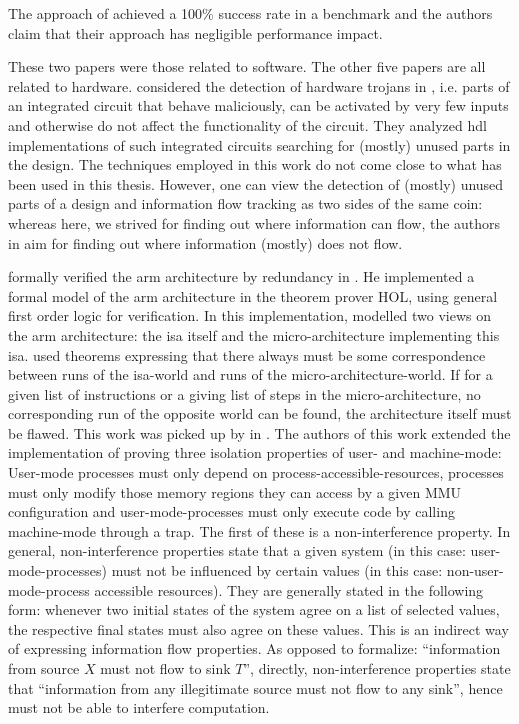 The approach of \cite{SuhLZD04} achieved a 100\% success rate in a benchmark and the authors claim that their approach has negligible performance impact.

These two papers were those related to software.
The other five papers are all related to hardware.
\citeauthor{Zhang15} considered the detection of hardware trojans in  \cite{Zhang15}, i.e. parts of an integrated circuit that behave maliciously, can be activated by very few inputs and otherwise do not affect the functionality of the circuit.
They analyzed \gls{hdl} implementations of such integrated circuits searching for (mostly) unused parts in the design.
The techniques employed in this work do not come close to what has been used in this thesis.
However, one can view the detection of (mostly) unused parts of a design and information flow tracking as two sides of the same coin: whereas here, we strived for finding out where information can flow, the authors in \cite{Zhang15} aim for finding out where information (mostly) does not flow.

\citeauthor{Fox02} formally verified the \gls{arm} architecture by redundancy in  \cite{Fox02}.
He implemented a formal model of the \gls{arm} architecture in the theorem prover HOL, using general first order logic for verification.
In this implementation, \citeauthor{Fox02} modelled two views on the \gls{arm} architecture: the \gls{isa} itself and the micro-architecture implementing this \gls{isa}.
\citeauthor{Fox02} used theorems expressing that there always must be some correspondence between runs of the \gls{isa}-world and runs of the micro-architecture-world.
If for a given list of instructions or a giving list of steps in the micro-architecture, no corresponding run of the opposite world can be found, the architecture itself must be flawed.
This work was picked up by \citeauthor{KhakpourSD13} in  \cite{KhakpourSD13}.
The authors of this work extended the implementation of \citeauthor{Fox02} proving three isolation properties of user- and machine-mode:
User-mode processes must only depend on process-accessible-resources, processes must only modify those memory regions they can access by a given MMU configuration and user-mode-processes must only execute code by calling machine-mode through a trap.
The first of these is a non-interference property.
In general, non-interference properties state that a given system (in this case: user-mode-processes) must not be influenced by certain values (in this case: non-user-mode-process accessible resources).
They are generally stated in the following form: whenever two initial states of the system agree on a list of selected values, the respective final states must also agree on these values.
This is an indirect way of expressing information flow properties.
As opposed to formalize: \enquote{information from source $ X $ must not flow to sink $ T $}, directly, non-interference properties state that \enquote{information from any illegitimate source must not flow to any sink}, hence must not be able to interfere computation.

